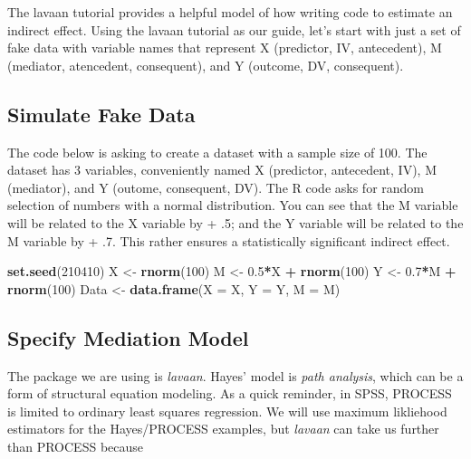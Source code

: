 \documentclass[
  11pt,
]{book}
\newenvironment{Shaded}{\begin{snugshade}}{\end{snugshade}}
\newcommand{\AttributeTok}[1]{\textcolor[rgb]{0.27,0.27,0.27}{#1}}
\newcommand{\DecValTok}[1]{\textcolor[rgb]{0.06,0.06,0.06}{#1}}
\newcommand{\FloatTok}[1]{\textcolor[rgb]{0.06,0.06,0.06}{#1}}
\newcommand{\FunctionTok}[1]{\textcolor[rgb]{0.27,0.27,0.27}{\textbf{#1}}}
\newcommand{\NormalTok}[1]{#1}
\newcommand{\OtherTok}[1]{\textcolor[rgb]{0.37,0.37,0.37}{#1}}
\newcommand{\SpecialCharTok}[1]{\textcolor[rgb]{0.43,0.43,0.43}{\textbf{#1}}}
\begin{document}
The lavaan tutorial \citep{rosseel_lavaan_2020} provides a helpful model of how writing code to estimate an indirect effect. Using the lavaan tutorial as our guide, let's start with just a set of fake data with variable names that represent X (predictor, IV, antecedent), M (mediator, atencedent, consequent), and Y (outcome, DV, consequent).

\hypertarget{simulate-fake-data}{%
\subsection{Simulate Fake Data}\label{simulate-fake-data}}

The code below is asking to create a dataset with a sample size of 100. The dataset has 3 variables, conveniently named X (predictor, antecedent, IV), M (mediator), and Y (outome, consequent, DV). The R code asks for random selection of numbers with a normal distribution. You can see that the M variable will be related to the X variable by + .5; and the Y variable will be related to the M variable by + .7. This rather ensures a statistically significant indirect effect.

\begin{Shaded}
\begin{Highlighting}[]
\FunctionTok{set.seed}\NormalTok{(}\DecValTok{210410}\NormalTok{)}
\NormalTok{X }\OtherTok{\textless{}{-}} \FunctionTok{rnorm}\NormalTok{(}\DecValTok{100}\NormalTok{)}
\NormalTok{M }\OtherTok{\textless{}{-}} \FloatTok{0.5}\SpecialCharTok{*}\NormalTok{X }\SpecialCharTok{+} \FunctionTok{rnorm}\NormalTok{(}\DecValTok{100}\NormalTok{)}
\NormalTok{Y }\OtherTok{\textless{}{-}} \FloatTok{0.7}\SpecialCharTok{*}\NormalTok{M }\SpecialCharTok{+} \FunctionTok{rnorm}\NormalTok{(}\DecValTok{100}\NormalTok{)}
\NormalTok{Data }\OtherTok{\textless{}{-}} \FunctionTok{data.frame}\NormalTok{(}\AttributeTok{X =}\NormalTok{ X, }\AttributeTok{Y =}\NormalTok{ Y, }\AttributeTok{M =}\NormalTok{ M)}
\end{Highlighting}
\end{Shaded}

\hypertarget{specify-mediation-model}{%
\subsection{Specify Mediation Model}\label{specify-mediation-model}}

The package we are using is \emph{lavaan}. Hayes' model is \emph{path analysis}, which can be a form of structural equation modeling. As a quick reminder, in SPSS, PROCESS is limited to ordinary least squares regression. We will use maximum likliehood estimators for the Hayes/PROCESS examples, but \emph{lavaan} can take us further than PROCESS because
\end{document}

